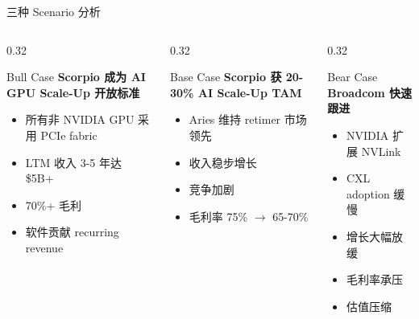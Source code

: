 \documentclass[aspectratio=169, 10pt, UTF8]{ctexbeamer}
\begin{document}
\begin{frame}{三种 Scenario 分析}
  \begin{columns}[T]
    \begin{column}{0.32\textwidth}
      \begin{exampleblock}{Bull Case}
        \textbf{Scorpio 成为 AI GPU Scale-Up 开放标准} \\
        \begin{itemize}
          \item 所有非 NVIDIA GPU 采用 PCIe fabric
          \item LTM 收入 3-5 年达 \$5B+
          \item 70\%+ 毛利
          \item 软件贡献 recurring revenue
        \end{itemize}
      \end{exampleblock}
    \end{column}
    \begin{column}{0.32\textwidth}
      \begin{block}{Base Case}
        \textbf{Scorpio 获 20-30\% AI Scale-Up TAM} \\
        \begin{itemize}
          \item Aries 维持 retimer 市场领先
          \item 收入稳步增长
          \item 竞争加剧
          \item 毛利率 75\% $\to$ 65-70\%
        \end{itemize}
      \end{block}
    \end{column}
    \begin{column}{0.32\textwidth}
      \begin{alertblock}{Bear Case}
        \textbf{Broadcom 快速跟进} \\
        \begin{itemize}
          \item NVIDIA 扩展 NVLink
          \item CXL adoption 缓慢
          \item 增长大幅放缓
          \item 毛利率承压
          \item 估值压缩
        \end{itemize}
      \end{alertblock}
    \end{column}
  \end{columns}
\end{frame}
\end{document}
